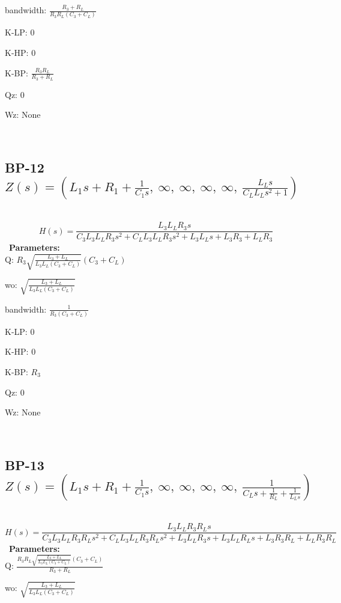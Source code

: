 \documentclass{article}
\begin{document}
bandwidth: $\frac{R_{3} + R_{L}}{R_{3} R_{L} \left(C_{3} + C_{L}\right)}$\ 

K-LP: $0$\ 

K-HP: $0$\ 

K-BP: $\frac{R_{3} R_{L}}{R_{3} + R_{L}}$\ 

Qz: $0$\ 

Wz: $\text{None}$\ 

\ 

\subsection{BP-12 $Z(s) = \left( L_{1} s + R_{1} + \frac{1}{C_{1} s}, \  \infty, \  \infty, \  \infty, \  \infty, \  \frac{L_{L} s}{C_{L} L_{L} s^{2} + 1}\right)$ } \ 
\textbf{\[H(s) = \frac{L_{3} L_{L} R_{3} s}{C_{3} L_{3} L_{L} R_{3} s^{2} + C_{L} L_{3} L_{L} R_{3} s^{2} + L_{3} L_{L} s + L_{3} R_{3} + L_{L} R_{3}}\] } \ 
\textbf{Parameters:}\\ 

Q: $R_{3} \sqrt{\frac{L_{3} + L_{L}}{L_{3} L_{L} \left(C_{3} + C_{L}\right)}} \left(C_{3} + C_{L}\right)$\ 

wo: $\sqrt{\frac{L_{3} + L_{L}}{L_{3} L_{L} \left(C_{3} + C_{L}\right)}}$\ 

bandwidth: $\frac{1}{R_{3} \left(C_{3} + C_{L}\right)}$\ 

K-LP: $0$\ 

K-HP: $0$\ 

K-BP: $R_{3}$\ 

Qz: $0$\ 

Wz: $\text{None}$\ 

\ 

\subsection{BP-13 $Z(s) = \left( L_{1} s + R_{1} + \frac{1}{C_{1} s}, \  \infty, \  \infty, \  \infty, \  \infty, \  \frac{1}{C_{L} s + \frac{1}{R_{L}} + \frac{1}{L_{L} s}}\right)$ } \ 
\textbf{\[H(s) = \frac{L_{3} L_{L} R_{3} R_{L} s}{C_{3} L_{3} L_{L} R_{3} R_{L} s^{2} + C_{L} L_{3} L_{L} R_{3} R_{L} s^{2} + L_{3} L_{L} R_{3} s + L_{3} L_{L} R_{L} s + L_{3} R_{3} R_{L} + L_{L} R_{3} R_{L}}\] } \ 
\textbf{Parameters:}\\ 

Q: $\frac{R_{3} R_{L} \sqrt{\frac{L_{3} + L_{L}}{L_{3} L_{L} \left(C_{3} + C_{L}\right)}} \left(C_{3} + C_{L}\right)}{R_{3} + R_{L}}$\ 

wo: $\sqrt{\frac{L_{3} + L_{L}}{L_{3} L_{L} \left(C_{3} + C_{L}\right)}}$\ 
\end{document}
